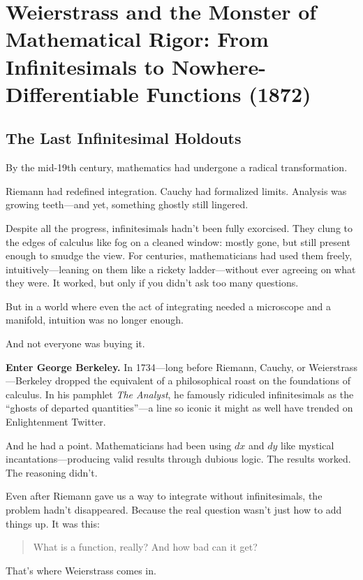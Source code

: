 \section{Weierstrass and the Monster of Mathematical Rigor: From Infinitesimals to Nowhere-Differentiable Functions (1872)}  

\subsection{The Last Infinitesimal Holdouts}

By the mid-19th century, mathematics had undergone a radical transformation.

Riemann had redefined integration. Cauchy had formalized limits. Analysis was growing teeth—and yet, something ghostly still lingered.

Despite all the progress, infinitesimals hadn’t been fully exorcised. They clung to the edges of calculus like fog on a cleaned window: mostly gone, but still present enough to smudge the view. For centuries, mathematicians had used them freely, intuitively—leaning on them like a rickety ladder—without ever agreeing on what they were. It worked, but only if you didn’t ask too many questions.

But in a world where even the act of integrating needed a microscope and a manifold, intuition was no longer enough.

And not everyone was buying it.

\textbf{Enter George Berkeley.} In 1734—long before Riemann, Cauchy, or Weierstrass—Berkeley dropped the equivalent of a philosophical roast on the foundations of calculus. In his pamphlet \emph{The Analyst}, he famously ridiculed infinitesimals as the “ghosts of departed quantities”—a line so iconic it might as well have trended on Enlightenment Twitter.

And he had a point. Mathematicians had been using \( dx \) and \( dy \) like mystical incantations—producing valid results through dubious logic. The results worked. The reasoning didn’t.

Even after Riemann gave us a way to integrate without infinitesimals, the problem hadn’t disappeared. Because the real question wasn’t just how to add things up. It was this:

\begin{quote}
What is a function, really? And how bad can it get?
\end{quote}

That’s where Weierstrass comes in.

